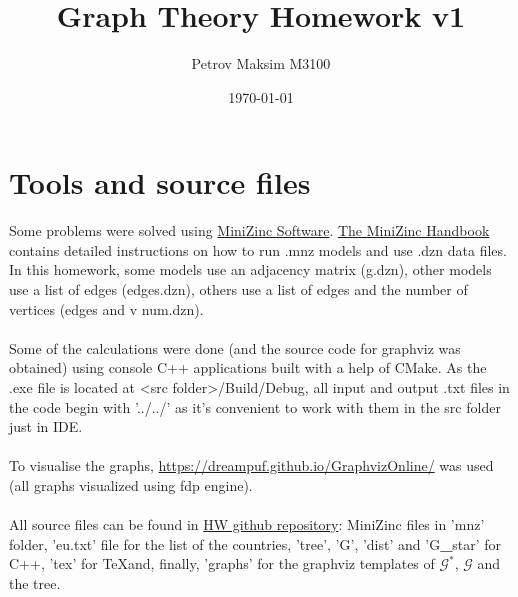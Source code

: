 \documentclass{article}
\title{\fontfamily{bch}\selectfont\Huge Graph Theory Homework v1}
\author{\Large Petrov Maksim M3100}
\date{\Large \today}
\begin{document}
	\fontsize{14pt}{16pt}\selectfont
	\maketitle
	
	\section*{Tools and source files}
	Some problems were solved using \href{https://www.minizinc.org/software.html}{MiniZinc Software}. \href{https://www.minizinc.org/doc-2.7.0/en/index.html}{The MiniZinc Handbook} contains detailed instructions on how to run .mnz models and use .dzn data files. In this homework, some models use an adjacency matrix (g.dzn), other models use a list of edges (edges.dzn), others use a list of edges and the number of vertices (edges and v num.dzn). \\\\
	Some of the calculations were done (and the source code for graphviz was obtained) using console C++ applications built with a help of CMake. As the .exe file is located at {\textless}src folder{\textgreater}/Build/Debug, all input and output .txt files in the code begin with '../../' as it's convenient to work with them in the src folder just in IDE.\\\\
	To visualise the graphs, \url{https://dreampuf.github.io/GraphvizOnline/} was used (all graphs visualized using fdp engine).\\\\
	All source files can be found in \href{https://github.com/fish-from-SanDiego/GraphTheoryHW}{HW github repository}:
	MiniZinc files in 'mnz' folder, 'eu.txt' file for the list of the countries, 'tree', 'G', 'dist' and 'G\textbf{\_}star' for C++, 'tex' for \TeX and, finally, 'graphs' for the graphviz templates of $\mathcal{G}^*$, $\mathcal{G}$ and the tree.
	\newpage
\end{document}
